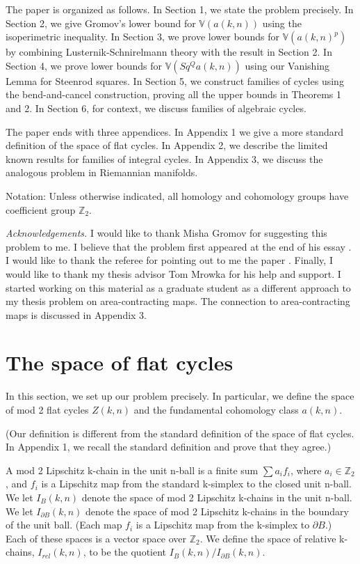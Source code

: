 \documentclass{amsart}
\newtheorem*{Theorem 1}{Theorem 1}
\newtheorem*{Theorem 2}{Theorem 2}
\newtheorem*{Theorem 1A}{Theorem 1A}
\newtheorem*{Theorem 2A}{Theorem 2A}
\newtheorem*{vanishing lemma}{Vanishing Lemma}
\numberwithin{equation}{section}
\begin{document}
\vskip3pt The paper is organized as follows.  In Section 1, we
state the problem precisely.  In Section 2, we give Gromov's
lower bound for $\mathbb{V}(a(k,n))$ using the isoperimetric
inequality.  In Section 3, we prove lower bounds for
$\mathbb{V}(a(k,n)^p)$ by combining Lusternik-Schnirelmann theory
with the result in Section 2.  In Section 4, we prove lower
bounds for $\mathbb{V}(Sq^Q a(k,n))$ using our Vanishing Lemma
for Steenrod squares.  In Section 5, we construct families of
cycles using the bend-and-cancel construction, proving all the
upper bounds in Theorems 1 and 2.  In Section 6, for context, we
discuss families of algebraic cycles.  

The paper ends with three appendices.  In Appendix 1 we give a
more standard definition of the space of flat cycles.  In Appendix 2,
we describe the limited known results for families of integral
cycles.  In Appendix 3, we discuss the analogous problem in
Riemannian manifolds.

\vskip3pt

Notation: Unless otherwise indicated, all homology and cohomology
groups have coefficient group $\mathbb{Z}_2$.

\vskip3pt

{\it Acknowledgements.} \hskip3pt I would like to thank Misha Gromov for
suggesting this problem to me.  I believe that the problem first
appeared at the end of his essay \cite{G2}.  I would like to thank
the referee for pointing out to me the paper \cite{G3}.  Finally, I 
would like to thank my
thesis advisor Tom Mrowka for his help and support.  I started
working on this material as a graduate student as a different
approach to my thesis problem on area-contracting maps.  The
connection to area-contracting maps is discussed in Appendix 3.


\section{The space of flat cycles}

In this section, we set up our problem precisely.  In particular,
we define the space of mod 2 flat cycles $Z(k,n)$ and the
fundamental cohomology class $a(k,n)$.

(Our definition is different from the standard definition of the
space of flat cycles.  In Appendix 1, we recall the standard
definition and prove that they agree.)

A mod 2 Lipschitz k-chain in the unit n-ball is a finite sum
$\sum a_i f_i$, where $a_i \in \mathbb{Z}_2$, and $f_i$ is a
Lipschitz map from the standard k-simplex to the closed unit
n-ball.  We let $I_B(k,n)$ denote the space of mod 2 Lipschitz
k-chains in the unit n-ball.  We let $I_{\partial B}(k,n)$ denote
the space of mod 2 Lipschitz k-chains in the boundary of the unit
ball.  (Each map $f_i$ is a Lipschitz map from the k-simplex to
$\partial B$.)  Each of these spaces is a vector space over
$\mathbb{Z}_2$.  We define the space of relative k-chains,
$I_{rel}(k,n)$, to be the quotient $I_B(k,n) / I_{\partial
B}(k,n)$.
\end{document}

